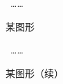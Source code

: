 \begin{figure}
\ContinuedFloat
  ……
\caption{某图形}
\end{figure}
\begin{figure}
\ContinuedFloat
  ……
\caption{某图形（续）}
\end{figure}
